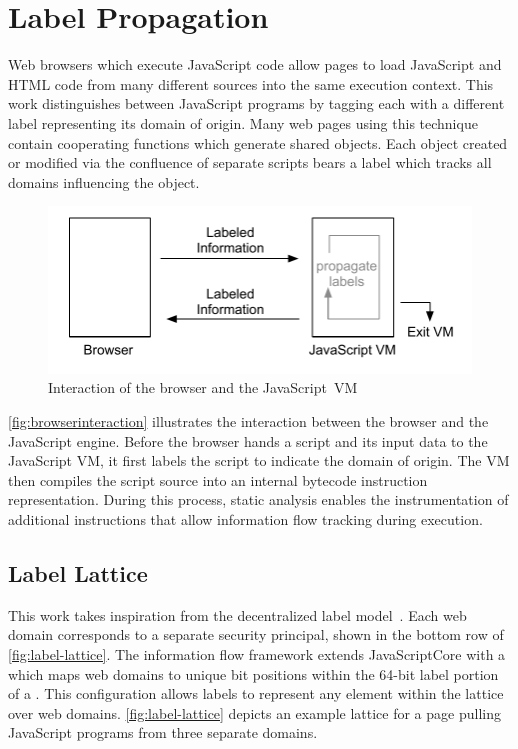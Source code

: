 
\chapter{Label Propagation}
\label{ch:label-propagation}

Web browsers which execute JavaScript code allow pages to load JavaScript and HTML code from many different sources into the same execution context.
This work distinguishes between JavaScript programs by tagging each with a different label representing its domain of origin.
Many web pages using this technique contain cooperating functions which generate shared objects.
Each object created or modified via the confluence of separate scripts bears a label which tracks all domains influencing the object.

\begin{figure}[ht]
  \centerline{\includegraphics[keepaspectratio=true]{images/browserinteraction.pdf}}
  \caption{Interaction of the browser and the JavaScript~VM}
  \label{fig:browserinteraction}
\end{figure}

\autoref{fig:browserinteraction} illustrates the interaction between the browser and the JavaScript engine.
Before the browser hands a script and its input data to the JavaScript VM, it first labels the script to indicate the domain of origin.
The VM then compiles the script source into an internal bytecode instruction representation.
During this process, static analysis enables the instrumentation of additional instructions that allow information flow tracking during execution.

\section{Label Lattice}
\label{sec:label-lattice}

This work takes inspiration from the decentralized label model~\cite{myers.liskov+00}.
Each web domain corresponds to a separate security principal, shown in the bottom row of \autoref{fig:label-lattice}.
The information flow framework extends JavaScriptCore with a  which maps web domains to unique bit positions within the 64-bit label portion of a .
This configuration allows labels to represent any element within the lattice over web domains.
\autoref{fig:label-lattice} depicts an example lattice for a page pulling JavaScript programs from three separate domains.

